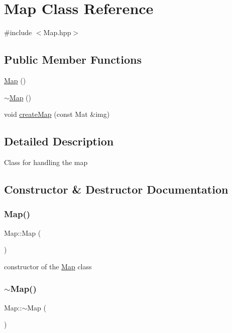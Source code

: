 \hypertarget{class_map}{}\section{Map Class Reference}
\label{class_map}


{\ttfamily \#include $<$Map.\+hpp$>$}

\subsection*{Public Member Functions}
\begin{DoxyCompactItemize}
\item 
\mbox{\hyperlink{class_map_a0f5ad0fd4563497b4214038cbca8b582}{Map}} ()
\item 
\mbox{\hyperlink{class_map_aa403fbe09394ccf39747588f5168e3b2}{$\sim$\+Map}} ()
\item 
void \mbox{\hyperlink{class_map_a02537656e91e97077dfdfc5d84c3027b}{create\+Map}} (const Mat \&img)
\end{DoxyCompactItemize}


\subsection{Detailed Description}
Class for handling the map 

\subsection{Constructor \& Destructor Documentation}
\mbox{\label{class_map_a0f5ad0fd4563497b4214038cbca8b582}} 
\subsubsection{\texorpdfstring{Map()}{Map()}}
{\footnotesize\ttfamily Map\+::\+Map (\begin{DoxyParamCaption}{ }\end{DoxyParamCaption})}

constructor of the \mbox{\hyperlink{class_map}{Map}} class \mbox{\label{class_map_aa403fbe09394ccf39747588f5168e3b2}} 
\subsubsection{\texorpdfstring{$\sim$\+Map()}{~Map()}}
{\footnotesize\ttfamily Map\+::$\sim$\+Map (\begin{DoxyParamCaption}{ }\end{DoxyParamCaption})}

